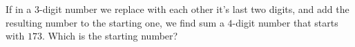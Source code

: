 If in a $3$-digit number  we replace with each other it's last two digits, and add the resulting number to the starting one, we find sum a $4$-digit number that starts with $173$. Which is the starting number?